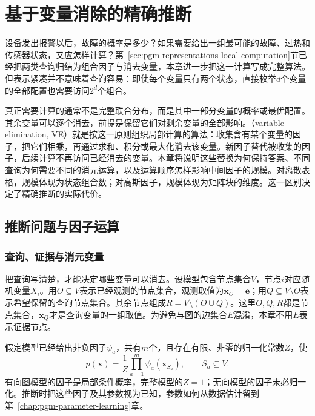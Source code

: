 \chapter{基于变量消除的精确推断}
\label{chap:pgm-elimination}

设备发出报警以后，故障的概率是多少？如果需要给出一组最可能的故障、过热和传感器状态，又应怎样计算？第~\ref{sec:pgm-representations-local-computation}节已经把两类查询归结为组合因子与消去变量，本章进一步把这一计算写成完整算法。但表示紧凑并不意味着查询容易：即使每个变量只有两个状态，直接枚举$d$个变量的全部配置也需要访问$2^d$个组合。

真正需要计算的通常不是完整联合分布，而是其中一部分变量的概率或最优配置。其余变量可以逐个消去，前提是保留它们对剩余变量的全部影响。（variable elimination, VE）就是按这一原则组织局部计算的算法：收集含有某个变量的因子，把它们相乘，再通过求和、积分或最大化消去该变量。新因子替代被收集的因子，后续计算不再访问已经消去的变量。本章将说明这些替换为何保持答案、不同查询为何需要不同的消元运算，以及运算顺序怎样影响中间因子的规模。对离散表格，规模体现为状态组合数；对高斯因子，规模体现为矩阵块的维度。这一区别决定了精确推断的实际代价。

\section{推断问题与因子运算}
\label{sec:pgm-elimination-factor-operations}

\subsection{查询、证据与消元变量}
\label{sec:pgm-elimination-query-evidence}

把查询写清楚，才能决定哪些变量可以消去。设模型包含节点集合$V$，节点$i$对应随机变量$X_i$。用$O\subseteq V$表示已经观测的节点集合，观测取值为$\bm{x}_O=\bm{e}$；用$Q\subseteq V\setminus O$表示希望保留的查询节点集合。其余节点组成$R=V\setminus(O\cup Q)$。这里$O,Q,R$都是节点集合，$\bm{x}_Q$才是查询变量的一组取值。为避免与图的边集合$E$混淆，本章不用$E$表示证据节点。

假定模型已经给出非负因子$\psi_a$，共有$m$个，且存在有限、非零的归一化常数$Z$，使
\begin{equation}
  p(\bm{x})=\frac{1}{Z}\prod_{a=1}^{m}\psi_a(\bm{x}_{S_a}),
  \qquad S_a\subseteq V.
  \label{eq:pgm-elimination-factorization}
\end{equation}
有向图模型的因子是局部条件概率，完整模型的$Z=1$；无向模型的因子未必归一化。推断时把这些因子及其参数视为已知，参数如何从数据估计留到第~\ref{chap:pgm-parameter-learning}章。

